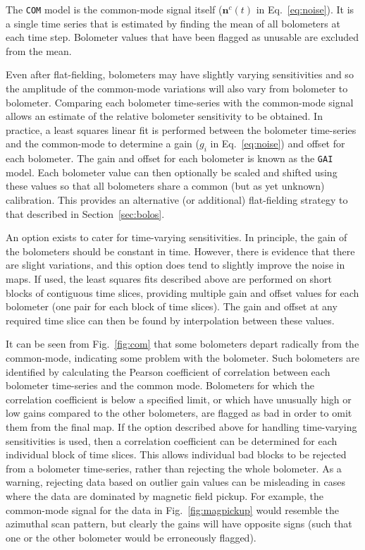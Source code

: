 \documentclass[useAMS,usenatbib,nofootinbib]{mn2e}
\newcommand{\model}[1]{\texttt{#1}}
\begin{document}
The \model{COM} model is the common-mode signal itself
($\mathbf{n}^{c}(t)$ in Eq.~\ref{eq:noise}). It is a single time
series that is estimated by finding the mean of all bolometers at each
time step. Bolometer values that have been flagged as unusable are
excluded from the mean.

Even after flat-fielding, bolometers may have slightly varying
sensitivities and so the amplitude of the common-mode variations will
also vary from bolometer to bolometer. Comparing each bolometer
time-series with the common-mode signal allows an estimate of the
relative bolometer sensitivity to be obtained. In practice, a least
squares linear fit is performed between the bolometer time-series and
the common-mode to determine a gain ($g_i$ in Eq.~\ref{eq:noise}) and
offset for each bolometer.  The gain and offset for each bolometer is
known as the \model{GAI} model. Each bolometer value can then
optionally be scaled and shifted using these values so that all
bolometers share a common (but as yet unknown) calibration. This
provides an alternative (or additional) flat-fielding strategy to that
described in Section~\ref{sec:bolos}.

An option exists to cater for time-varying sensitivities. In
principle, the gain of the bolometers should be constant in
time. However, there is evidence that there are slight variations, and
this option does tend to slightly improve the noise in maps.  If used,
the least squares fits described above are performed on short blocks
of contiguous time slices, providing multiple gain and offset values
for each bolometer (one pair for each block of time slices). The gain
and offset at any required time slice can then be found by
interpolation between these values.

It can be seen from Fig.~\ref{fig:com} that some bolometers depart
radically from the common-mode, indicating some problem with the
bolometer. Such bolometers are identified by calculating the Pearson
coefficient of correlation between each bolometer time-series and the
common mode. Bolometers for which the correlation coefficient is below
a specified limit, or which have unusually high or low gains compared
to the other bolometers, are flagged as bad in order to omit them from
the final map. If the option described above for handling time-varying
sensitivities is used, then a correlation coefficient can be
determined for each individual block of time slices.  This allows
individual bad blocks to be rejected from a bolometer time-series,
rather than rejecting the whole bolometer. As a warning, rejecting
data based on outlier gain values can be misleading in cases where the
data are dominated by magnetic field pickup. For example, the
common-mode signal for the data in Fig.~\ref{fig:magpickup} would
resemble the azimuthal scan pattern, but clearly the gains will have
opposite signs (such that one or the other bolometer would be
erroneously flagged).
\end{document}

